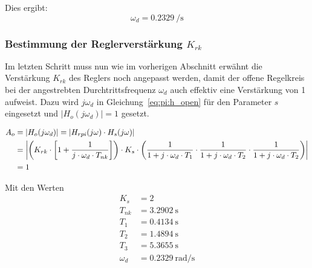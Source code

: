 Dies ergibt:
\begin{equation} \label{eq:pi:omega_d}
    \omega_d = \SI{0.2329}{\per\second}
\end{equation}


\subsubsection{Bestimmung der Reglerverst\"arkung $K_{rk}$}

Im  letzten  Schritt  muss  nun  wie im  vorherigen  Abschnitt  erw\"ahnt  die
Verst\"arkung  $K_{rk}$   des  Reglers   noch  angepasst  werden,   damit  der
offene   Regelkreis  bei   der  angestrebten   Durchtrittsfrequenz  $\omega_d$
auch  effektiv  eine Verst\"arkung  von  1  aufweist.  Dazu  wird  $j\omega_d$
in  Gleichung~\ref{eq:pi:h_open}  f\"ur  den   Parameter  $s$  eingesetzt  und
$|H_o(j\omega_d)| = 1$ gesetzt.

\begin{gather} \label{eq:pi:A_o_set_to_one}
    \begin{split}
        A_o & = | H_o (j\omega_d) | = | H_{rpi} (j\omega) \cdot H_s (j\omega)| \\
            & = \abs*{
                    \bigg(
                        K_{rk} \cdot \biggl[ 1 + \frac{1}{j \cdot \omega_d \cdot T_{nk}} \biggr]
                    \bigg)
                    \cdot
                    K_s
                    \cdot
                    \bigg(
                            \frac{1}{1 + j \cdot \omega_d \cdot T_1}
                      \cdot \frac{1}{1 + j \cdot \omega_d \cdot T_2}
                      \cdot \frac{1}{1 + j \cdot \omega_d \cdot T_2}
                      \bigg)} \\
              & = 1
    \end{split}
\end{gather}

Mit den Werten
\begin{equation} \label{eq:pi:values}
    \begin{split}
        K_s      & = 2                    \\
        T_{nk}   & = \SI{3.2902}{\second} \\
        T_1      & = \SI{0.4134}{\second} \\
        T_2      & = \SI{1.4894}{\second} \\
        T_3      & = \SI{5.3655}{\second} \\
        \omega_d & = \SI{0.2329}{\radian\per\second}
    \end{split}
\end{equation}

